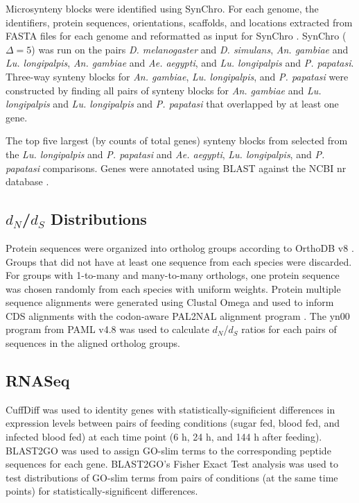Microsynteny blocks were identified using SynChro. For each genome, the identifiers, protein sequences, orientations, scaffolds, and locations extracted from FASTA files for each genome and reformatted as input for SynChro \cite{Drillon2014}.  SynChro ($\Delta=5$) was run on the pairs \emph{D. melanogaster} and \emph{D. simulans}, \emph{An. gambiae} and \emph{Lu. longipalpis}, \emph{An. gambiae} and \emph{Ae. aegypti}, and \emph{Lu. longipalpis} and \emph{P. papatasi}.  Three-way synteny blocks for \emph{An. gambiae}, \emph{Lu. longipalpis}, and \emph{P. papatasi} were constructed by finding all pairs of synteny blocks for \emph{An. gambiae} and \emph{Lu. longipalpis} and \emph{Lu. longipalpis} and \emph{P. papatasi} that overlapped by at least one gene.  

The top five largest (by counts of total genes) synteny blocks from selected from the \emph{Lu. longipalpis} and \emph{P. papatasi} and \emph{Ae. aegypti}, \emph{Lu. longipalpis}, and \emph{P. papatasi} comparisons.  Genes were annotated using BLAST against the NCBI nr database \cite{Pruitt2007}.

\subsection{$d_N$/$d_S$ Distributions}
Protein sequences were organized into ortholog groups according to OrthoDB v8 \cite{Kriventseva2015}. Groups that did not have at least one sequence from each species were discarded.  For groups with 1-to-many and many-to-many orthologs, one protein sequence was chosen randomly from each species with uniform weights. Protein multiple sequence alignments were generated using Clustal Omega \cite{Sievers2011} and used to inform CDS alignments with the codon-aware PAL2NAL alignment program \cite{Suyama2006}.  The yn00 program from PAML v4.8 \cite{Yang2007} was used to calculate $d_N$/$d_S$ ratios for each pairs of sequences in the aligned ortholog groups.

\subsection{RNASeq}
CuffDiff \cite{Trapnell2010} was used to identity genes with statistically-significient differences in expression levels between pairs of feeding conditions (sugar fed, blood fed, and infected blood fed) at each time point (6 h, 24 h, and 144 h after feeding).  BLAST2GO \cite{Conesa2005,Gotz2008} was used to assign GO-slim terms \cite{Consortium2004} to the corresponding peptide sequences for each gene. BLAST2GO's Fisher Exact Test analysis was used to test distributions of GO-slim terms from pairs of conditions (at the same time points) for statistically-significent differences.

